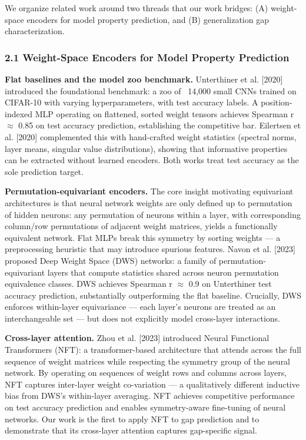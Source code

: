 
We organize related work around two threads that our work bridges: (A) weight-space encoders for model
property prediction, and (B) generalization gap characterization.

\subsubsection{2.1 Weight-Space Encoders for Model Property Prediction}

\textbf{Flat baselines and the model zoo benchmark.} Unterthiner et al. [2020] introduced the foundational
benchmark: a zoo of ~14,000 small CNNs trained on CIFAR-10 with varying hyperparameters, with test accuracy
labels. A position-indexed MLP operating on flattened, sorted weight tensors achieves Spearman r $\approx$ 0.85 on
test accuracy prediction, establishing the competitive bar. Eilertsen et al. [2020] complemented this with
hand-crafted weight statistics (spectral norms, layer means, singular value distributions), showing that
informative properties can be extracted without learned encoders. Both works treat test accuracy as the
sole prediction target.

\textbf{Permutation-equivariant encoders.} The core insight motivating equivariant architectures is that neural
network weights are only defined up to permutation of hidden neurons: any permutation of neurons within a
layer, with corresponding column/row permutations of adjacent weight matrices, yields a functionally
equivalent network. Flat MLPs break this symmetry by sorting weights --- a preprocessing heuristic that may
introduce spurious features. Navon et al. [2023] proposed Deep Weight Space (DWS) networks: a family of
permutation-equivariant layers that compute statistics shared across neuron permutation equivalence classes.
DWS achieves Spearman r $\approx$ 0.9 on Unterthiner test accuracy prediction, substantially outperforming the flat
baseline. Crucially, DWS enforces within-layer equivariance --- each layer's neurons are treated as an
interchangeable set --- but does not explicitly model cross-layer interactions.

\textbf{Cross-layer attention.} Zhou et al. [2023] introduced Neural Functional Transformers (NFT): a
transformer-based architecture that attends across the full sequence of weight matrices while respecting
the symmetry group of the neural network. By operating on sequences of weight rows and columns across
layers, NFT captures inter-layer weight co-variation --- a qualitatively different inductive bias from
DWS's within-layer averaging. NFT achieves competitive performance on test accuracy prediction and
enables symmetry-aware fine-tuning of neural networks. Our work is the first to apply NFT to gap
prediction and to demonstrate that its cross-layer attention captures gap-specific signal.

